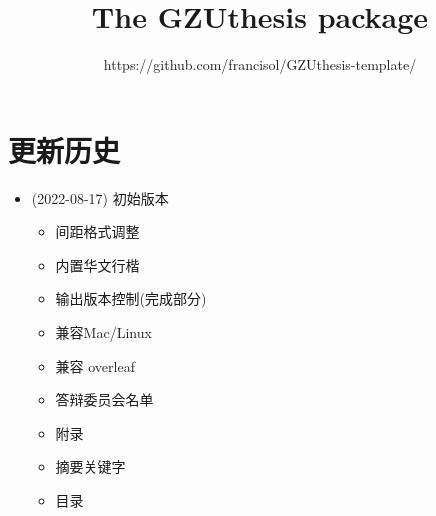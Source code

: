 \documentclass{ctxdoc}
\begin{document}
    \title{The \textsf{GZUthesis} package}
    \author{https://github.com/francisol/GZUthesis-template/}
    \maketitle

    \section*{更新历史}

    \begin{itemize}
        \item[1.0.0] (2022-08-17) 初始版本
        \begin{itemize}
            \item 间距格式调整
            \item 内置华文行楷
            \item 输出版本控制(完成部分)
            \item 兼容Mac/Linux
            \item 兼容 overleaf
            \item 答辩委员会名单
            \item 附录
            \item 摘要关键字
            \item 目录
        \end{itemize}


\end{itemize}
\end{document}
